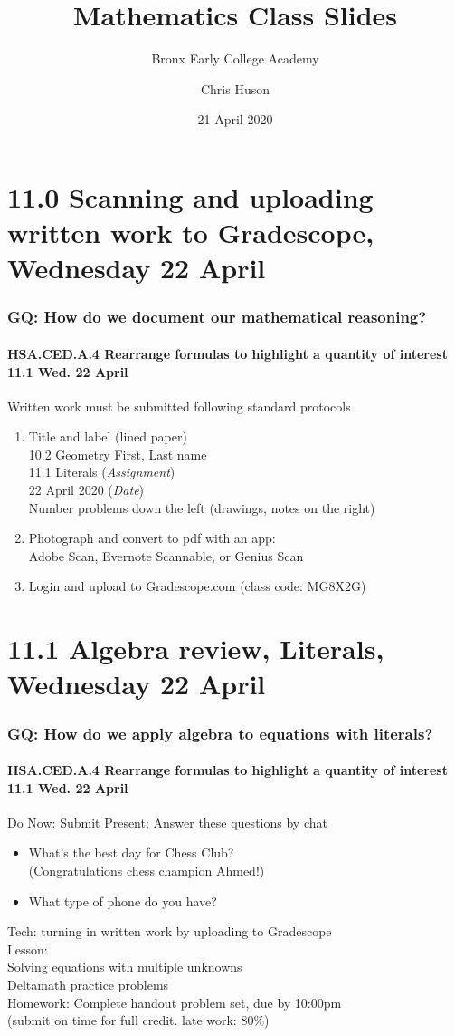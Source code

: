 \documentclass{beamer}
\title{Mathematics Class Slides}
\subtitle{Bronx Early College Academy}
\author{Chris Huson}
\date{21 April 2020}
\begin{document}
\frame{\titlepage}
\section[Outline]{}
\frame{\tableofcontents}

\section{11.0 Scanning and uploading written work to Gradescope, Wednesday 22 April} 
\frame
{
  \frametitle{GQ: How do we document our mathematical reasoning?}
  \framesubtitle{HSA.CED.A.4 Rearrange formulas to highlight a quantity of interest \hfill \alert{11.1 Wed. 22 April}}

  Written work must be submitted following standard protocols
  
  \begin{enumerate}
      \item Title and label (lined paper) \\[0.25cm]
      10.2 Geometry \hfill First, Last name \\
      11.1 Literals (\emph{Assignment})\\
      22 April 2020 (\emph{Date}) \\[0.25cm]
      Number problems down the left (drawings, notes on the right)
      \item Photograph and convert to pdf with an app: \\
      \quad Adobe Scan, Evernote Scannable, or Genius Scan
      \item Login and upload to Gradescope.com (class code: \alert{MG8X2G})
    \end{enumerate}
}

\section{11.1 Algebra review, Literals, Wednesday 22 April} 
\frame
{
  \frametitle{GQ: How do we apply algebra to equations with literals?}
  \framesubtitle{HSA.CED.A.4 Rearrange formulas to highlight a quantity of interest \hfill \alert{11.1 Wed. 22 April}}

  \begin{block}{Do Now: Submit Present; Answer these questions by chat}
    \begin{itemize}
      \item What's the best day for Chess Club? \\
      (Congratulations chess champion Ahmed!)
      \item What type of phone do you have? 
    \end{itemize}

    \end{block}
    Tech: turning in written work by uploading to Gradescope \\[0.25cm]
    Lesson: \\
    Solving equations with multiple unknowns\\
    Deltamath practice problems \\[0.25cm]
    Homework: Complete handout problem set, due by 10:00pm \\
    (submit on time for full credit. late work: 80\%)
}
\end{document}
